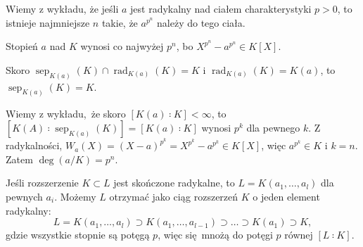 \documentclass[a4paper, 12pt]{article}
\DeclareMathOperator{\sep}{sep}
\DeclareMathOperator{\rad}{rad}
\newcommand{\+}{\enspace}
\begin{document}
\fi
Wiemy z wykładu, że jeśli $a$ jest radykalny nad ciałem charakterystyki $p>0$, to
istnieje najmniejsze $n$ takie, że $a^{p^n}$ należy do tego ciała.

Stopień $a$ nad $K$ wynosi co najwyżej $p^n$, bo
$X^{p^n}-a^{p^n} ∈ K[X]$.

Skoro $\sep_{K(a)}(K) \cap \rad_{K(a)}(K) = K$ i $\rad_{K(a)}(K) = K(a)$, to $\sep_{K(a)}(K) = K$.

Wiemy z wykładu, że skoro $[K(a) ∶ K] < ∞$, to
$[K(A) ∶ \sep_{K(a)}(K)] = [K(a) ∶ K]$ wynosi $p^k$ dla pewnego $k$.
Z radykalności, $W_a(X) = (X-a)^{p^k} = X^{p^k} - a^{p^k} ∈ K[X]$,
więc $a^{p^k} ∈ K$ i $k=n$.
Zatem $\deg(a/K) = p^n$.

Jeśli rozszerzenie $K⊂L$ jest skończone radykalne,
to $L=K(a_1,…,a_l)$ dla pewnych $a_i$.
Możemy $L$ otrzymać jako ciąg rozszerzeń $K$ o jeden element radykalny:
$$L=K(a_1,…,a_l) ⊃ K(a_1,…,a_{l-1}) ⊃ … ⊃ K(a_1) ⊃ K,$$
gdzie wszystkie stopnie są potęgą $p$, więc się mnożą do potęgi $p$ równej $[L ∶ K]$.


\iffalse
\section*{4/11}
Załóżmy, że liczby $m,n>1$ są względnie pierwsze
i $ζ_n, ζ_m ∈ ℂ$ to pierwiastki pierwotne z $1$ stopni $n,m$ odpowiednio.

Bez straty ogólności załóżmy, że $ζ_i = e^{2πi\frac{1}{n}}.$
Zauważmy, że $ζ_n = ζ_{nm}^{m}, ζ_m = ζ_{nm}^{n}$,
więc z względnej pierwszości $n$ i $m$, dla pewnych $x,y∈ℤ$
mamy $ζ_n^x ζ_m^y = ζ_{nm}^{mx+ny} = ζ_{nm}^{1}$.
Zatem $ℚ(ζ_n,ζ_m) = ℚ(ζ_{nm})$.

$[ℚ(ζ_k) ∶ ℚ] = φ(k)$.

$φ(nm) = [ℚ(ζ_{nm}) ∶ ℚ] ≤ [ℚ(ζ_n) ∶ ℚ][ℚ(ζ_m) ∶ ℚ] = φ(n)φ(m)
\fi
\end{document}

